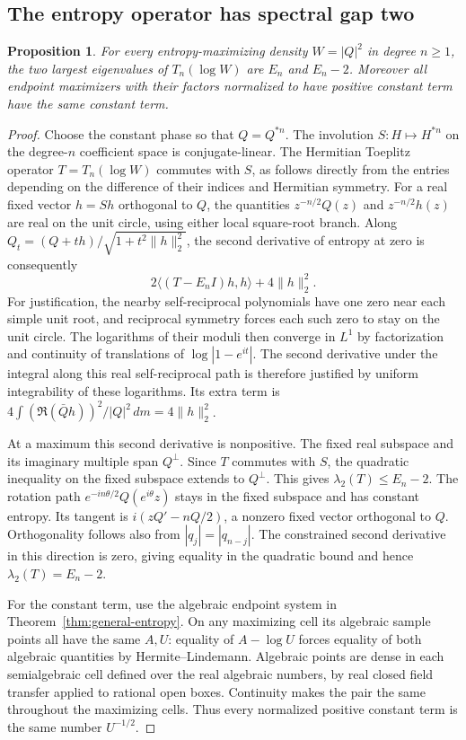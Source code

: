 \documentclass[11pt]{article}
\newtheorem{proposition}[theorem]{Proposition}
\begin{document}
\subsection{The entropy operator has spectral gap two}

\begin{proposition}\label{prop:entropy-gap}
For every entropy-maximizing density \(W=|Q|^2\) in degree
\(n\geq1\), the two largest eigenvalues of \(T_n(\log W)\)
are \(E_n\) and \(E_n-2\). Moreover all endpoint maximizers
with their factors normalized to have positive constant term
have the same constant term.
\end{proposition}

\begin{proof}
Choose the constant phase so that \(Q=Q^{*n}\).
The involution \(S:H\mapsto H^{*n}\) on the degree-\(n\)
coefficient space is conjugate-linear. The Hermitian Toeplitz
operator \(T=T_n(\log W)\) commutes with \(S\), as follows
directly from the entries depending on the difference of
their indices and Hermitian symmetry. For a real fixed vector
\(h=Sh\) orthogonal to \(Q\), the quantities
\(z^{-n/2}Q(z)\) and \(z^{-n/2}h(z)\) are real on the unit
circle, using either local square-root branch. Along
\(Q_t=(Q+th)/\sqrt{1+t^2\|h\|_2^2}\), the second derivative
of entropy at zero is consequently
\[
 2\langle (T-E_n I)h,h\rangle+4\|h\|_2^2 .
\]
For justification, the nearby self-reciprocal polynomials have
one zero near each simple unit root, and reciprocal symmetry
forces each such zero to stay on the unit circle.
The logarithms of their moduli then converge in \(L^1\) by
factorization and continuity of translations of
\(\log|1-e^{it}|\). The second derivative under the integral
along this real self-reciprocal path is therefore justified
by uniform integrability of these logarithms. Its extra term
is \(4\int(\Re(\bar Q h))^2/|Q|^2\,dm=4\|h\|_2^2\).

At a maximum this second derivative is nonpositive. The fixed
real subspace and its imaginary multiple span \(Q^\perp\).
Since \(T\) commutes with \(S\), the quadratic inequality on
the fixed subspace extends to \(Q^\perp\). This gives
\(\lambda_2(T)\le E_n-2\).
The rotation path
\(e^{-in\theta/2}Q(e^{i\theta}z)\) stays in the fixed subspace
and has constant entropy. Its tangent is
\(i(zQ'-nQ/2)\), a nonzero fixed vector orthogonal to \(Q\).
Orthogonality follows also from
\(|q_j|=|q_{n-j}|\). The constrained second derivative in
this direction is zero, giving equality in the quadratic
bound and hence \(\lambda_2(T)=E_n-2\).

For the constant term, use the algebraic endpoint system in
Theorem~\ref{thm:general-entropy}. On any maximizing cell its
algebraic sample points all have the same \(A,U\):
equality of \(A-\log U\) forces equality of both algebraic
quantities by Hermite--Lindemann. Algebraic points are dense
in each semialgebraic cell defined over the real algebraic
numbers, by real closed field transfer applied to rational
open boxes. Continuity makes the pair the same throughout the
maximizing cells. Thus every normalized positive constant
term is the same number \(U^{-1/2}\).
\end{proof}
\end{document}
